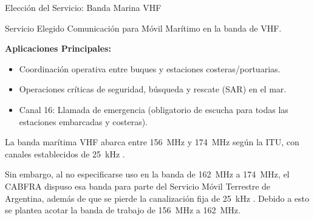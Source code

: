 \documentclass[10pt]{beamer}
\begin{document}
\begin{frame}{Elección del Servicio: Banda Marina VHF}
    \begin{block}{Servicio Elegido}
        Comunicación para Móvil Marítimo en la banda de VHF.
    \end{block}
    
    \vspace{0.3cm}
    
    \textbf{Aplicaciones Principales:}
    \begin{itemize}
        \item Coordinación operativa entre buques y estaciones costeras/portuarias.
        
        \item Operaciones críticas de seguridad, búsqueda y rescate (SAR) en el mar.

        \item Canal 16: Llamada de emergencia (obligatorio de escucha para todas las estaciones embarcadas y costeras).
    \end{itemize}

    \vspace{0.3cm}

    La banda marítima VHF abarca entre 156~MHz y 174~MHz según la ITU, con canales establecidos de 25~kHz \cite{uit}.
    
    Sin embargo, al no especificarse uso en la banda de 162~MHz a 174~MHz, el CABFRA dispuso esa banda para parte del Servicio Móvil Terrestre de Argentina, además de que se pierde la canalización fija de 25~kHz \cite{cabfra}. Debido a esto se plantea acotar la banda de trabajo de 156~MHz a 162~MHz.
    
\end{frame}
\end{document}
